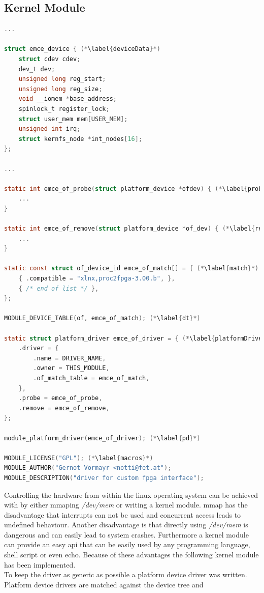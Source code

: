 \documentclass[11pt,technote,a4paper,onecolumn,dvips]{IEEEtran}
\begin{document}
\subsection{Kernel Module}
\begin{lstlisting}[float,language=C,caption={Basic elements of a platform driver module},label=src:pdriver,basicstyle=\ttfamily\tiny]
...

struct emce_device { (*\label{deviceData}*)
	struct cdev cdev;
	dev_t dev;
	unsigned long reg_start;
	unsigned long reg_size;
	void __iomem *base_address;
	spinlock_t register_lock;
	struct user_mem mem[USER_MEM];
	unsigned int irq;
	struct kernfs_node *int_nodes[16];
};

...

static int emce_of_probe(struct platform_device *ofdev) { (*\label{probe}*)
	...
}

static int emce_of_remove(struct platform_device *of_dev) { (*\label{remove}*)
	...
}

static const struct of_device_id emce_of_match[] = { (*\label{match}*)
	{ .compatible = "xlnx,proc2fpga-3.00.b", },
	{ /* end of list */ },
};

MODULE_DEVICE_TABLE(of, emce_of_match); (*\label{dt}*)

static struct platform_driver emce_of_driver = { (*\label{platformDriver}*)
	.driver = {
		.name = DRIVER_NAME,
		.owner = THIS_MODULE,
		.of_match_table = emce_of_match,
	},
	.probe = emce_of_probe,
	.remove = emce_of_remove,
};

module_platform_driver(emce_of_driver); (*\label{pd}*)

MODULE_LICENSE("GPL"); (*\label{macros}*)
MODULE_AUTHOR("Gernot Vormayr <notti@fet.at");
MODULE_DESCRIPTION("driver for custom fpga interface");
\end{lstlisting}
Controlling the hardware from within the linux operating system can be
achieved with by either mmaping \emph{/dev/mem} or writing a kernel module.
mmap has the disadvantage that interrupts can not be used and concurrent
access leads to undefined behaviour. Another disadvantage is that directly
using \emph{/dev/mem} is dangerous and can easily lead to system crashes.
Furthermore a kernel module can provide an easy api that can be easily
used by any programming language, shell script or even echo. Because of
these advantages the following kernel module has been implemented.\\
To keep the driver as generic as possible a platform device driver was
written. Platform device drivers are matched against the device tree and
\end{document}
